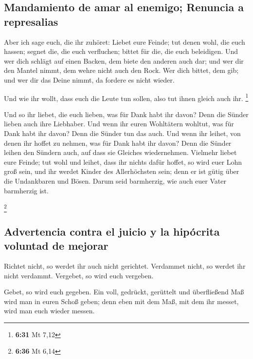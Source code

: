 \hypertarget{mandamiento-de-amar-al-enemigo-renuncia-a-represalias}{%
\subsection{Mandamiento de amar al enemigo; Renuncia a
represalias}\label{mandamiento-de-amar-al-enemigo-renuncia-a-represalias}}

 Aber ich sage euch, die ihr zuhöret: Liebet eure Feinde;
tut denen wohl, die euch hassen;  segnet die, die euch
verfluchen; bittet für die, die euch beleidigen.  Und wer
dich schlägt auf einen Backen, dem biete den anderen auch dar; und wer
dir den Mantel nimmt, dem wehre nicht auch den Rock.  Wer
dich bittet, dem gib; und wer dir das Deine nimmt, da fordere es nicht
wieder.

 Und wie ihr wollt, dass euch die Leute tun sollen, also
tut ihnen gleich auch ihr. \footnote{\textbf{6:31} Mt 7,12}

 Und so ihr liebet, die euch lieben, was für Dank habt
ihr davon? Denn die Sünder lieben auch ihre Liebhaber. 
Und wenn ihr euren Wohltätern wohltut, was für Dank habt ihr davon? Denn
die Sünder tun das auch.  Und wenn ihr leihet, von denen
ihr hoffet zu nehmen, was für Dank habt ihr davon? Denn die Sünder
leihen den Sündern auch, auf dass sie Gleiches wiedernehmen.
 Vielmehr liebet eure Feinde; tut wohl und leihet, dass
ihr nichts dafür hoffet, so wird euer Lohn groß sein, und ihr werdet
Kinder des Allerhöchsten sein; denn er ist gütig über die Undankbaren
und Bösen.  Darum seid barmherzig, wie auch euer Vater
barmherzig ist.

\footnote{\textbf{6:36} Mt 6,14}

\hypertarget{advertencia-contra-el-juicio-y-la-hipuxf3crita-voluntad-de-mejorar}{%
\subsection{Advertencia contra el juicio y la hipócrita voluntad de
mejorar}\label{advertencia-contra-el-juicio-y-la-hipuxf3crita-voluntad-de-mejorar}}

 Richtet nicht, so werdet ihr auch nicht gerichtet.
Verdammet nicht, so werdet ihr nicht verdammt. Vergebet, so wird euch
vergeben.

 Gebet, so wird euch gegeben. Ein voll, gedrückt,
gerüttelt und überfließend Maß wird man in euren Schoß geben; denn eben
mit dem Maß, mit dem ihr messet, wird man euch wieder messen.

